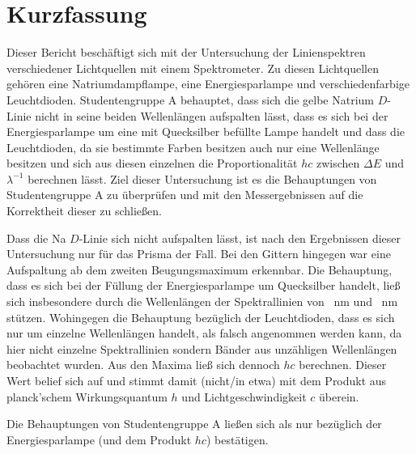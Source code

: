 \section{Kurzfassung}

	Dieser Bericht beschäftigt sich mit der Untersuchung der Linienspektren verschiedener Lichtquellen mit einem Spektrometer.
	Zu diesen Lichtquellen gehören eine Natriumdampflampe, eine Energiesparlampe und verschiedenfarbige Leuchtdioden.
	Studentengruppe A behauptet, dass sich die gelbe Natrium $D$-Linie nicht in seine beiden Wellenlängen aufspalten lässt, dass es sich bei der Energiesparlampe um eine mit Quecksilber befüllte Lampe handelt und dass die Leuchtdioden, da sie bestimmte Farben besitzen auch nur eine Wellenlänge besitzen und sich aus diesen einzelnen die Proportionalität $hc$ zwischen $\Delta E$ und $\lambda^{-1}$ berechnen lässt.
	Ziel dieser Untersuchung ist es die Behauptungen von Studentengruppe A zu überprüfen und mit den Messergebnissen auf die Korrektheit dieser zu schließen.
	
	Dass die Na $D$-Linie sich nicht aufspalten lässt, ist nach den Ergebnissen dieser Untersuchung nur für das Prisma der Fall.
	Bei den Gittern hingegen war eine Aufspaltung ab dem zweiten Beugungsmaximum erkennbar.
	Die Behauptung, dass es sich bei der Füllung der Energiesparlampe um Quecksilber handelt, ließ sich insbesondere durch die Wellenlängen der Spektrallinien von \SI{}{\nano\meter} und \SI{}{\nano\meter} stützen.
	Wohingegen die Behauptung bezüglich der Leuchtdioden, dass es sich nur um einzelne Wellenlängen handelt, als falsch angenommen werden kann, da hier nicht einzelne Spektrallinien sondern Bänder aus unzähligen Wellenlängen beobachtet wurden. 
	Aus den Maxima ließ sich dennoch $hc$ berechnen.
	Dieser Wert belief sich auf \SI{}{} und stimmt damit (nicht/in etwa) mit dem Produkt aus planck'schem Wirkungsquantum $h$ und Lichtgeschwindigkeit $c$ überein.
	
	Die Behauptungen von Studentengruppe A ließen sich als nur bezüglich der Energiesparlampe (und dem Produkt $hc$) bestätigen.
	
